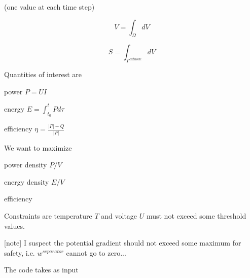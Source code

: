 \documentclass[10pt, oneside]{article}   	%
\begin{document}
(one value at each time step)

\begin{equation}
V = \int_\Omega dV
\end{equation}

\begin{equation}
S = \int_{\Gamma^{cathode}} dV
\end{equation}

Quantities of interest are 

power $P=UI$

energy $E=\int_{t_0}^t P d\tau$

efficiency $\eta=\frac{|P|-Q}{|P|}$

We want to maximize 

power density $P/V$

energy density $E/V$

efficiency

Constraints are 
temperature $T$ and voltage $U$ must not exceed some threshold values.

[note] 
I suspect the potential gradient should not exceed some maximum for safety,
i.e. $w^{separator}$ cannot go to zero...

The code takes as input
\end{document}

